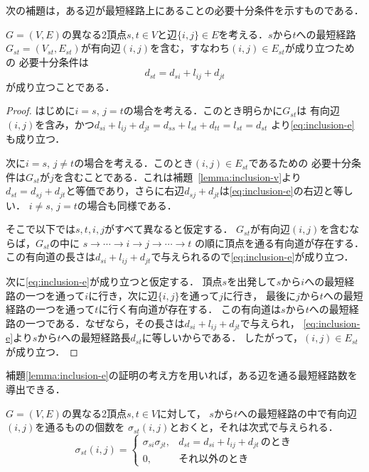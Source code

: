 次の補題は，ある辺が最短経路上にあることの必要十分条件を示すものである．

\begin{lemma}
  \label{lemma:inclusion-e}
  $G=(V,E)$の異なる2頂点$s,t\in V$と辺$\{i,j\} \in E$を考える．$s$から$t$への最短経路
  $G_{st}=(V_{st},E_{st})$が有向辺$(i,j)$を含む，すなわち$(i,j) \in E_{st}$が成り立つための
  必要十分条件は
  \begin{equation}
    d_{st}=d_{si}+l_{ij}+d_{jt}
    \label{eq:inclusion-e}
  \end{equation}
  が成り立つことである．
\end{lemma}
\begin{proof}
  はじめに$i=s$, $j=t$の場合を考える．このとき明らかに$G_{st}$は
  有向辺$(i,j)$を含み，かつ$d_{si}+l_{ij}+d_{jt}=d_{ss}+l_{st}+d_{tt}=l_{st}=d_{st}$
  より\eqref{eq:inclusion-e}も成り立つ．

  次に$i=s$, $j \neq t$の場合を考える．このとき$(i,j)\in E_{st}$であるための
  必要十分条件は$G_{st}$が$j$を含むことである．これは補題~\ref{lemma:inclusion-v}より
  $d_{st}=d_{sj}+d_{jt}$と等価であり，さらに右辺$d_{sj}+d_{jt}$は\eqref{eq:inclusion-e}の右辺と等しい．
  $i\neq s$, $j=t$の場合も同様である．

  そこで以下では$s,t,i,j$がすべて異なると仮定する．
  $G_{st}$が有向辺$(i,j)$を含むならば，$G_{st}$の中に
  $s \rightarrow \cdots \rightarrow i \rightarrow j \rightarrow \cdots \rightarrow t$
  の順に頂点を通る有向道が存在する．
  この有向道の長さは$d_{si}+l_{ij}+d_{jt}$で与えられるので\eqref{eq:inclusion-e}が成り立つ．

  次に\eqref{eq:inclusion-e}が成り立つと仮定する．
  頂点$s$を出発して$s$から$i$への最短経路の一つを通って$i$に行き，次に辺$\{i,j\}$を通って$j$に行き，
  最後に$j$から$t$への最短経路の一つを通って$t$に行く有向道が存在する．
  この有向道は$s$から$t$への最短経路の一つである．なぜなら，その長さは$d_{si}+l_{ij}+d_{jt}$で与えられ，
  \eqref{eq:inclusion-e}より$s$から$t$への最短経路長$d_{st}$に等しいからである．
  したがって，$(i,j) \in E_{st}$が成り立つ．
\end{proof}

補題\ref{lemma:inclusion-e}の証明の考え方を用いれば，ある辺を通る最短経路数を導出できる．

\begin{lemma}
  $G=(V,E)$の異なる2頂点$s,t \in V$に対して，
  $s$から$t$への最短経路の中で有向辺$(i,j)$を通るものの個数を
  $\sigma_{st}(i,j)$とおくと，それは次式で与えられる．
  \begin{equation*}
    \sigma_{st}(i,j)=
    \begin{cases}
      \sigma_{si} \sigma_{jt}, & d_{st}=d_{si}+l_{ij}+d_{jt}\,\text{のとき} \\
      0, & \text{それ以外のとき}
    \end{cases}
  \end{equation*}
\end{lemma}

